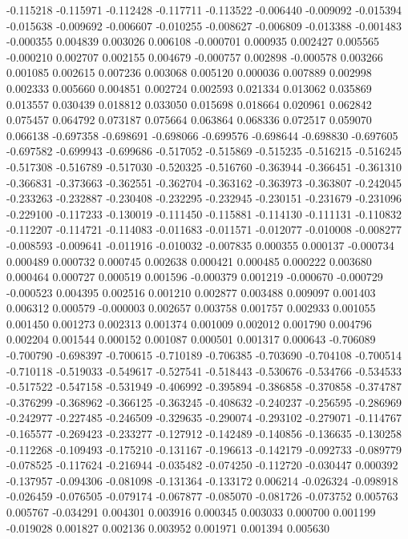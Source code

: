 -0.115218
-0.115971
-0.112428
-0.117711
-0.113522
-0.006440
-0.009092
-0.015394
-0.015638
-0.009692
-0.006607
-0.010255
-0.008627
-0.006809
-0.013388
-0.001483
-0.000355
0.004839
0.003026
0.006108
-0.000701
0.000935
0.002427
0.005565
-0.000210
0.002707
0.002155
0.004679
-0.000757
0.002898
-0.000578
0.003266
0.001085
0.002615
0.007236
0.003068
0.005120
0.000036
0.007889
0.002998
0.002333
0.005660
0.004851
0.002724
0.002593
0.021334
0.013062
0.035869
0.013557
0.030439
0.018812
0.033050
0.015698
0.018664
0.020961
0.062842
0.075457
0.064792
0.073187
0.075664
0.063864
0.068336
0.072517
0.059070
0.066138
-0.697358
-0.698691
-0.698066
-0.699576
-0.698644
-0.698830
-0.697605
-0.697582
-0.699943
-0.699686
-0.517052
-0.515869
-0.515235
-0.516215
-0.516245
-0.517308
-0.516789
-0.517030
-0.520325
-0.516760
-0.363944
-0.366451
-0.361310
-0.366831
-0.373663
-0.362551
-0.362704
-0.363162
-0.363973
-0.363807
-0.242045
-0.233263
-0.232887
-0.230408
-0.232295
-0.232945
-0.230151
-0.231679
-0.231096
-0.229100
-0.117233
-0.130019
-0.111450
-0.115881
-0.114130
-0.111131
-0.110832
-0.112207
-0.114721
-0.114083
-0.011683
-0.011571
-0.012077
-0.010008
-0.008277
-0.008593
-0.009641
-0.011916
-0.010032
-0.007835
0.000355
0.000137
-0.000734
0.000489
0.000732
0.000745
0.002638
0.000421
0.000485
0.000222
0.003680
0.000464
0.000727
0.000519
0.001596
-0.000379
0.001219
-0.000670
-0.000729
-0.000523
0.004395
0.002516
0.001210
0.002877
0.003488
0.009097
0.001403
0.006312
0.000579
-0.000003
0.002657
0.003758
0.001757
0.002933
0.001055
0.001450
0.001273
0.002313
0.001374
0.001009
0.002012
0.001790
0.004796
0.002204
0.001544
0.000152
0.001087
0.000501
0.001317
0.000643
-0.706089
-0.700790
-0.698397
-0.700615
-0.710189
-0.706385
-0.703690
-0.704108
-0.700514
-0.710118
-0.519033
-0.549617
-0.527541
-0.518443
-0.530676
-0.534766
-0.534533
-0.517522
-0.547158
-0.531949
-0.406992
-0.395894
-0.386858
-0.370858
-0.374787
-0.376299
-0.368962
-0.366125
-0.363245
-0.408632
-0.240237
-0.256595
-0.286969
-0.242977
-0.227485
-0.246509
-0.329635
-0.290074
-0.293102
-0.279071
-0.114767
-0.165577
-0.269423
-0.233277
-0.127912
-0.142489
-0.140856
-0.136635
-0.130258
-0.112268
-0.109493
-0.175210
-0.131167
-0.196613
-0.142179
-0.092733
-0.089779
-0.078525
-0.117624
-0.216944
-0.035482
-0.074250
-0.112720
-0.030447
0.000392
-0.137957
-0.094306
-0.081098
-0.131364
-0.133172
0.006214
-0.026324
-0.098918
-0.026459
-0.076505
-0.079174
-0.067877
-0.085070
-0.081726
-0.073752
0.005763
0.005767
-0.034291
0.004301
0.003916
0.000345
0.003033
0.000700
0.001199
-0.019028
0.001827
0.002136
0.003952
0.001971
0.001394
0.005630
